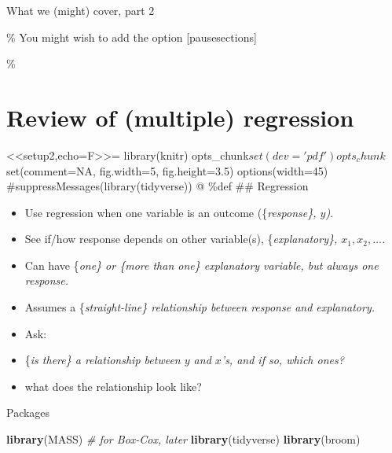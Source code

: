 \documentclass[ignorenonframetext,]{beamer}
\newenvironment{Shaded}{\begin{snugshade}}{\end{snugshade}}
\newcommand{\CommentTok}[1]{\textcolor[rgb]{0.56,0.35,0.01}{\textit{#1}}}
\newcommand{\KeywordTok}[1]{\textcolor[rgb]{0.13,0.29,0.53}{\textbf{#1}}}
\newcommand{\NormalTok}[1]{#1}
\begin{document}
\begin{frame}{What we (might) cover, part 2}
\protect\hypertarget{what-we-might-cover-part-2}{}

\tableofcontents[sections={11-}]  \% You might wish to add the option
{[}pausesections{]}

\%

\usepackage[utf8]{inputenc}

\section{Review of (multiple) regression}
\frame{\sectionpage}

\textless{}\textless{}setup2,echo=F\textgreater{}\textgreater{}=
library(knitr)
opts\_chunk\(set(dev = 'pdf')  opts_chunk\)set(comment=NA, fig.width=5,
fig.height=3.5) options(width=45) \#suppressMessages(library(tidyverse))
@ \%def \#\# Regression

\begin{itemize}
\item
  Use regression when one variable is an outcome (\{\em response\},
  \(y\)).
\item
  See if/how response depends on other variable(s), \{\em explanatory\},
  \(x_1, x_2,\ldots\).
\item
  Can have \{\em one\} or \{\em more than one\} explanatory variable,
  but always one response.
\item
  Assumes a \{\em straight-line\} relationship between response and
  explanatory.
\item
  Ask:
\item
  \{\em is there\} a relationship between \(y\) and \(x\)'s, and if so,
  which ones?
\item
  what does the relationship look like?
\end{itemize}

\end{frame}

\begin{frame}[fragile]{Packages}
\protect\hypertarget{packages}{}

\begin{Shaded}
\begin{Highlighting}[]
\KeywordTok{library}\NormalTok{(MASS) }\CommentTok{# for Box-Cox, later}
\KeywordTok{library}\NormalTok{(tidyverse)}
\KeywordTok{library}\NormalTok{(broom)}
\end{Highlighting}
\end{Shaded}

\end{frame}
\end{document}
